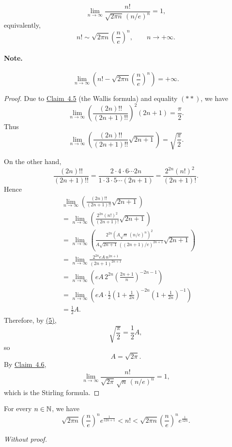 \begin{claim}\label{claim:4.7}
\[
\lim_{n\to\infty}
\frac{n!}{\sqrt{2\pi n}\,(n/e)^n}=1,
\]
equivalently,
\[
n!\sim\sqrt{2\pi n}\left(\frac ne\right)^n,
\qquad n\to+\infty.
\]
\end{claim}

\paragraph{Note.}
\[
\lim_{n\to\infty}
\left(
 n!-\sqrt{2\pi n}\left(\frac ne\right)^n
\right)=+\infty.
\]

\begin{proof}
Due to \hyperref[claim:4.5]{Claim~4.5} (the Wallis formula) and equality \hyperref[eq:4:starstar:1]{$(**)$}, we have
\[
\lim_{n\to\infty}
\left(\frac{(2n)!!}{(2n+1)!!}\right)^2(2n+1)
=\frac{\pi}{2}.
\]
Thus
\[
\lim_{n\to\infty}
\left(
\frac{(2n)!!}{(2n+1)!!}\sqrt{2n+1}
\right)
=\sqrt{\frac{\pi}{2}}.
\tag{5}\label{eq:4:5:1}
\]

On the other hand,
\[
\frac{(2n)!!}{(2n+1)!!}
=\frac{2\cdot4\cdot6\cdots2n}{1\cdot3\cdot5\cdots(2n+1)}
=\frac{2^{2n}(n!)^2}{(2n+1)!}.
\]
Hence
\begin{align*}
&\lim_{n\to\infty}
\left(
\frac{(2n)!!}{(2n+1)!!}\sqrt{2n+1}
\right)\\
&=\lim_{n\to\infty}
\left(
\frac{2^{2n}(n!)^2}{(2n+1)!}\sqrt{2n+1}
\right)\\
&=\lim_{n\to\infty}
\left(
\frac{2^{2n}\left(A\sqrt n\,(n/e)^n\right)^2}
{A\sqrt{2n+1}\,((2n+1)/e)^{2n+1}}
\sqrt{2n+1}
\right)\\
&=\lim_{n\to\infty}
\frac{2^{2n}eA\,n^{2n+1}}{(2n+1)^{2n+1}}\\
&=\lim_{n\to\infty}
\left(
 eA\,2^{2n}\left(\frac{2n+1}{n}\right)^{-2n-1}
\right)\\
&=\lim_{n\to\infty}
\left(
 eA\cdot\frac12
 \left(1+\frac1{2n}\right)^{-2n}
 \left(1+\frac1{2n}\right)^{-1}
\right)\\
&=\frac12A.
\end{align*}
Therefore, by \hyperref[eq:4:5:1]{(5)},
\[
\sqrt{\frac{\pi}{2}}=\frac12A,
\]
so
\[
A=\sqrt{2\pi}.
\]
By \hyperref[claim:4.6]{Claim~4.6},
\[
\lim_{n\to\infty}
\frac{n!}{\sqrt{2\pi}\,\sqrt n\,(n/e)^n}=1,
\]
which is the Stirling formula.
\end{proof}

\begin{claim}\label{claim:4.8}
For every $n\in\mathbb{N}$, we have
\[
\sqrt{2\pi n}\left(\frac ne\right)^n e^{\frac{1}{12n+1}}
<n!
<\sqrt{2\pi n}\left(\frac ne\right)^n e^{\frac{1}{12n}}.
\]
\end{claim}

\noindent\emph{Without proof.}
